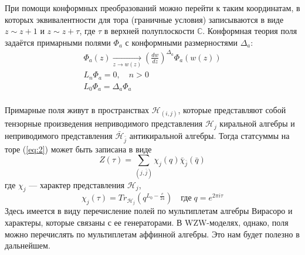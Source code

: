\documentclass[a4paper,12pt]{article}
\theoremstyle{definition} \newtheorem{Def}{Definition}
\begin{document}
При помощи конформных преобразований можно перейти к таким координатам, в которых
эквивалентности для тора (граничные условия) записываются в виде $z\sim z+1$ и $z\sim z+\tau$, где $\tau$ в верхней полуплоскости
$\mathbb{C}$.
Конформная теория поля задаётся примарными полями $\Phi_a$ с конформными размерностями $\Delta_a$:
\begin{equation}
  \label{eq:3}
  \begin{split} \Phi_{a}(z)\underset{z\to w(z)}{\longrightarrow}
\left(\frac{dw}{dz}\right)^{\Delta_a}\Phi_{a}(w(z))\\ L_n \Phi_a=0,\quad n>0\\ L_0 \Phi_a=\Delta_a
\Phi_a\\
  \end{split}
\end{equation}

Примарные поля живут в пространствах $\mathcal{H}_{(i,j)}$, которые представляют собой тензорные
произведения неприводимого представления $\mathcal{H}_j$ киральной алгебры и неприводимого
представления $\bar{\mathcal{H}}_{\bar{j}}$ антикиральной алгебры. Тогда статсуммы на торе
(\ref{eq:2}) может быть записана в виде
\begin{equation}
  \label{eq:9}
    Z(\tau)=\sum_{(j,\bar j)}\chi_j(q)\bar \chi_{\bar j}(\bar q)
\end{equation}
где $\chi_j$ --- характер представления $\mathcal{H}_j$,
\begin{equation}
  \label{eq:5} \chi_j(\tau)=Tr_{\mathcal{H}_j}(q^{L_0-\frac{c}{24}})\quad \mbox{где}\; q=e^{2\pi i
\tau}
\end{equation}
Здесь имеется в виду перечисление полей по мультиплетам алгебры Вирасоро и характеры, которые
связаны с ее генераторами. В WZW-моделях, однако, поля можно перечислять по мультиплетам аффинной
алгебры. Это нам будет полезно в дальнейшем.
\end{document}
